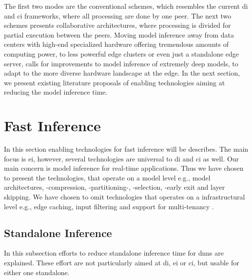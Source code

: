 The first two modes are the conventional schemes, which resembles the current \gls{di} and \gls{ci} frameworks, where all processing are done by one peer. The next two schemes presents collaborative architectures, where processing is divided for partial execution between the peers.
Moving model inference away from data centers with high-end specialized hardware offering tremendous amounts of computing power, to less powerful edge clusters or even just a standalone edge server, calls for improvements to model inference of extremely deep models, to adapt to the more diverse hardware landscape at the edge. In the next section, we present existing literature proposals of enabling technologies aiming at reducing the model inference time.

\section{Fast Inference} \label{sec:ei-fast-inference}

In this section enabling technologies for fast inference will be describes. The main focus is \gls{ei}, however, several technologies are universal to \gls{di} and \gls{ci} as well. Our main concern is model inference for real-time applications. Thus we have chosen to present the technologies, that operate on a model level e.g., model architectures, -compression, -partitioning-, -selection, -early exit and layer skipping. We have chosen to omit technologies that operates on a infrastructural level e.g., edge caching, input filtering and support for multi-tenancy \cite{zhou_edge_2019}.

\subsection{Standalone Inference}

In this subsection efforts to reduce standalone inference time for \gls{dnn}s are explained. These effort are not particularly aimed at \gls{di}, \gls{ei} or \gls{ci}, but usable for either one standalone.

